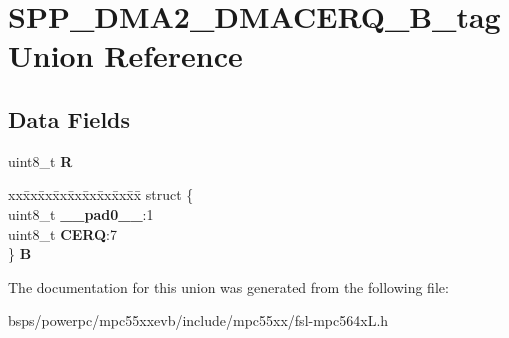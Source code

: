 \hypertarget{unionSPP__DMA2__DMACERQ__8B__tag}{}\section{S\+P\+P\+\_\+\+D\+M\+A2\+\_\+\+D\+M\+A\+C\+E\+R\+Q\+\_\+B\+\_\+tag Union Reference}
\label{unionSPP__DMA2__DMACERQ__8B__tag}
\subsection*{Data Fields}
\begin{DoxyCompactItemize}
\item 
\mbox{\label{unionSPP__DMA2__DMACERQ__8B__tag_a85b171c613c5e3bcc7ad8d8d5e3489d6}} 
uint8\+\_\+t {\bfseries R}
\item 
\mbox{\label{unionSPP__DMA2__DMACERQ__8B__tag_a214ddc9b2b568031d6fd083c0105af39}} 
\begin{tabbing}
xx\=xx\=xx\=xx\=xx\=xx\=xx\=xx\=xx\=\kill
struct \{\\
\>uint8\_t {\bfseries \_\_pad0\_\_}:1\\
\>uint8\_t {\bfseries CERQ}:7\\
\} {\bfseries B}\\

\end{tabbing}\end{DoxyCompactItemize}


The documentation for this union was generated from the following file\+:\begin{DoxyCompactItemize}
\item 
bsps/powerpc/mpc55xxevb/include/mpc55xx/fsl-\/mpc564x\+L.\+h\end{DoxyCompactItemize}
